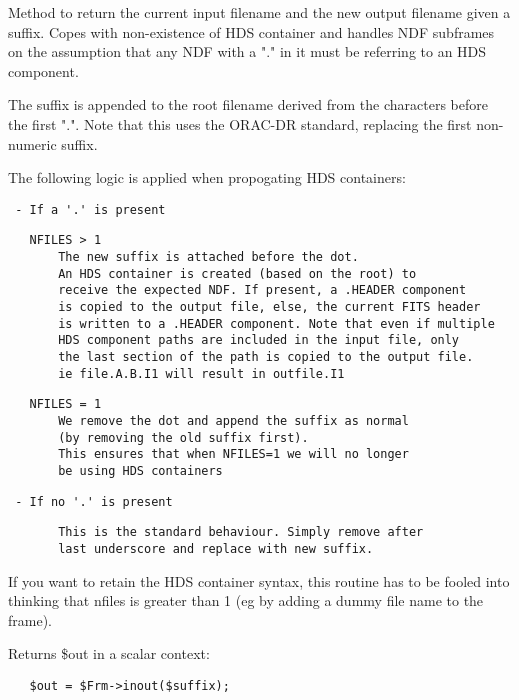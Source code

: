 \begin{description}
Method to return the current input filename and the new output
filename given a suffix.  Copes with non-existence of HDS container
and handles NDF subframes on the assumption that any NDF with a
"." in it must be referring to an HDS component.



The suffix is appended to the root filename derived from the characters
before the first ".". Note that this uses the ORAC-DR standard, replacing
the first non-numeric suffix.



The following logic is applied when propogating HDS containers:

\begin{verbatim}
 - If a '.' is present
\end{verbatim}
\begin{verbatim}
   NFILES > 1
       The new suffix is attached before the dot.
       An HDS container is created (based on the root) to
       receive the expected NDF. If present, a .HEADER component
       is copied to the output file, else, the current FITS header
       is written to a .HEADER component. Note that even if multiple
       HDS component paths are included in the input file, only
       the last section of the path is copied to the output file.
       ie file.A.B.I1 will result in outfile.I1
\end{verbatim}
\begin{verbatim}
   NFILES = 1
       We remove the dot and append the suffix as normal
       (by removing the old suffix first).
       This ensures that when NFILES=1 we will no longer
       be using HDS containers
\end{verbatim}
\begin{verbatim}
 - If no '.' is present
\end{verbatim}
\begin{verbatim}
       This is the standard behaviour. Simply remove after
       last underscore and replace with new suffix.
\end{verbatim}


If you want to retain the HDS container syntax, this routine has to be
fooled into thinking that nfiles is greater than 1 (eg by adding a dummy
file name to the frame).



Returns \$out in a scalar context:

\begin{verbatim}
   $out = $Frm->inout($suffix);
\end{verbatim}



\end{description}
